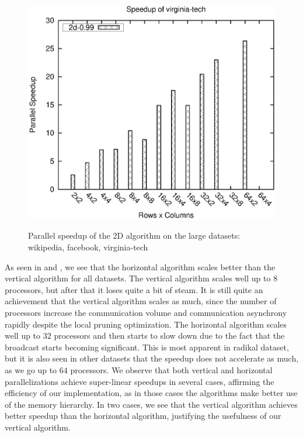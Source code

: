 \documentclass{comjnl}
\begin{document}
\begin{figure}[!htb]
\begin{center}
{      \includegraphics[scale=0.435]{../perf/benchmark-new.ulakbim/virginia-tech.speedup2d.ps}
    }
    \caption{Parallel speedup of the 2D algorithm on the large
      datasets: wikipedia, facebook, virginia-tech}
    \label{fig:2dspeedup-large}
  \end{center}
\end{figure}

As seen in  and
,
we see that the horizontal algorithm scales better
than the vertical algorithm for all datasets. The vertical algorithm scales well up to
$8$ processors, but after that it loses quite a bit of steam.  It is
still quite an achievement that the vertical algorithm scales as much,
since the number of processors increase the communication volume and
communication asynchrony rapidly despite the local pruning
optimization. The horizontal algorithm scales well up to $32$
processors and then starts to slow down due to the fact that the
broadcast starts becoming significant. This is most apparent in
radikal dataset, but it is also seen in other datasets that the
speedup does not accelerate as much, as we go up to $64$ processors.
We observe that both vertical and horizontal parallelizations achieve
super-linear speedups in several cases, affirming the efficiency of
our implementation, as in those cases the algorithms make better use
of the memory hierarchy. In two cases, we see that the vertical
algorithm achieves better speedup than the horizontal algorithm,
justifying the usefulness of our vertical algorithm. 
\end{document}
